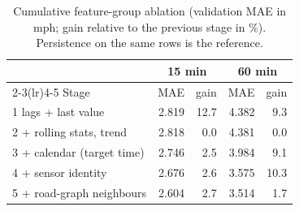\begin{table}[t]
\centering
\caption{Cumulative feature-group ablation (validation MAE in mph; gain relative to the previous stage in \%). Persistence on the same rows is the reference.}
\label{tab:ablation}
\small
\begin{tabular}{@{}lrrrr@{}}
\toprule
 & \multicolumn{2}{c}{15 min} & \multicolumn{2}{c}{60 min} \\
\cmidrule(lr){2-3}\cmidrule(lr){4-5}
Stage & MAE & gain & MAE & gain \\
\midrule
1 lags + last value & 2.819 & 12.7 & 4.382 & 9.3 \\
2 + rolling stats, trend & 2.818 & 0.0 & 4.381 & 0.0 \\
3 + calendar (target time) & 2.746 & 2.5 & 3.984 & 9.1 \\
4 + sensor identity & 2.676 & 2.6 & 3.575 & 10.3 \\
5 + road-graph neighbours & 2.604 & 2.7 & 3.514 & 1.7 \\
\bottomrule
\end{tabular}
\end{table}
